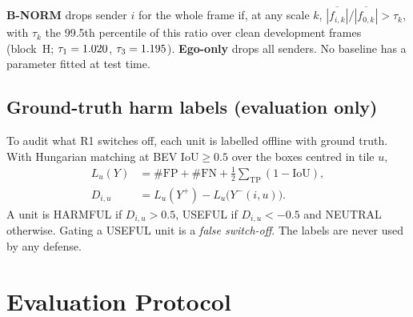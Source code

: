 \documentclass[conference]{IEEEtran}
\begin{document}
\textbf{B-NORM} drops sender $i$ for the whole frame if, at any scale $k$,
$\overline{|f_{i,k}|}/\overline{|f_{0,k}|}>\tau_k$, with $\tau_k$ the 99.5th percentile of this ratio over clean
development frames (block~H; $\tau_1=1.020$, $\tau_3=1.195$). \textbf{Ego-only} drops all
senders. No baseline has a parameter fitted at test time.

\subsection{Ground-truth harm labels (evaluation only)}
To audit what R1 switches off, each unit is labelled offline with ground truth. With Hungarian matching at
BEV IoU${}\ge 0.5$ over the boxes centred in tile $u$,
\begin{equation}
\begin{split}
L_u(Y)&=\#\mathrm{FP}+\#\mathrm{FN}+\tfrac12\textstyle\sum_{\mathrm{TP}}(1-\mathrm{IoU}),\\
D_{i,u}&=L_u(Y^{+})-L_u\big(Y^{-}(i,u)\big).
\end{split}
\label{eq:harm}
\end{equation}
A unit is HARMFUL if $D_{i,u}>0.5$, USEFUL if $D_{i,u}<-0.5$ and NEUTRAL otherwise. Gating a USEFUL unit is a
\emph{false switch-off}. The labels are never used by any defense.

\section{Evaluation Protocol}
\label{sec:protocol}
\end{document}
